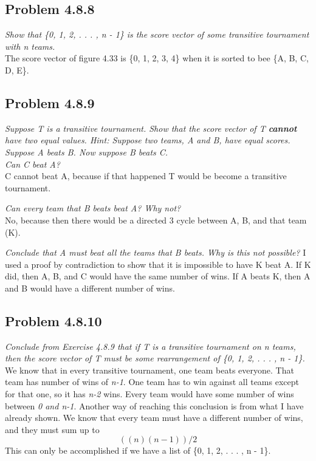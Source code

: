 \documentclass[11pt]{article} %
\newcommand\tab[1][1cm]{\hspace*{#1}}
\begin{document}
\subsection*{Problem 4.8.8}
\textit{Show that \{0, 1, 2, . . . , n - 1\} is the score vector of some transitive tournament with n teams.}
\\ \tab The score vector of figure 4.33 is \{0, 1, 2, 3, 4\} when it is sorted to bee \{A, B, C, D, E\}.

\subsection*{Problem 4.8.9}
\textit{Suppose T is a transitive tournament. Show that the score vector of T \textbf{cannot} have two equal values. Hint: Suppose two teams, A and B, have equal scores. Suppose A beats B. Now suppose B beats C.} \\
\textit{Can C beat A?}
\\ \tab C cannot beat A, because if that happened T would be become a transitive tournament.

\textit{Can every team that B beats beat A? Why not?}
\\ \tab No, because then there would be a directed 3 cycle between A, B, and that team (K).

\textit{Conclude that A must beat all the teams that B beats. Why is this not possible?}
I used a proof by contradiction to show that it is impossible to have K beat A. If K did, then A, B, and C would have the same number of wins. If A beats K, then A and B would have a different number of wins. 
\\ \tab 

\subsection*{Problem 4.8.10}
\textit{Conclude from Exercise 4.8.9 that if T is a transitive tournament on n teams, 
then the score vector of T must be some rearrangement of \{0, 1, 2, . . . , n - 1\}.}
\\ \tab We know that in every transitive tournament, one team beats everyone. That team has number of wins of \textit{n-1}. One team has to win against all teams except for that one, so it has \textit{n-2} wins. Every team would have some number of wins between \textit{0 and n-1}. Another way of reaching this conclusion is from what I have already shown. We know that every team must have a different number of wins, and they must sum up to \begin{displaymath}((n)(n-1))/2\end{displaymath}
This can only be accomplished if we have a list of \{0, 1, 2, . . . , n - 1\}. 
\end{document}
